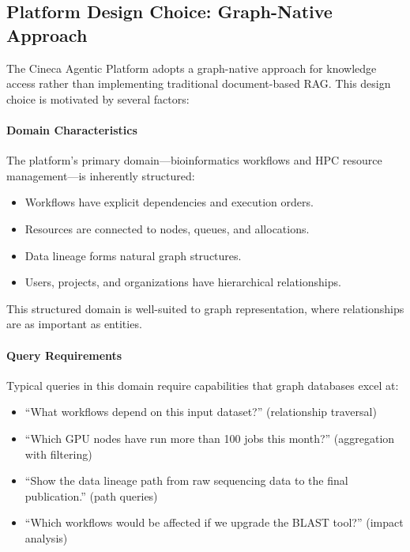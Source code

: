 \documentclass[a4paper,twoside]{sapthesis}
\begin{document}
\subsection{Platform Design Choice: Graph-Native Approach}

The Cineca Agentic Platform adopts a graph-native approach for knowledge access rather than implementing traditional document-based RAG. This design choice is motivated by several factors:

\paragraph{Domain Characteristics}

The platform's primary domain---bioinformatics workflows and HPC resource management---is inherently structured:

\begin{itemize}
    \item Workflows have explicit dependencies and execution orders.
    \item Resources are connected to nodes, queues, and allocations.
    \item Data lineage forms natural graph structures.
    \item Users, projects, and organizations have hierarchical relationships.
\end{itemize}

This structured domain is well-suited to graph representation, where relationships are as important as entities.

\paragraph{Query Requirements}

Typical queries in this domain require capabilities that graph databases excel at:

\begin{itemize}
    \item ``What workflows depend on this input dataset?'' (relationship traversal)
    \item ``Which GPU nodes have run more than 100 jobs this month?'' (aggregation with filtering)
    \item ``Show the data lineage path from raw sequencing data to the final publication.'' (path queries)
    \item ``Which workflows would be affected if we upgrade the BLAST tool?'' (impact analysis)
\end{itemize}
\end{document}
